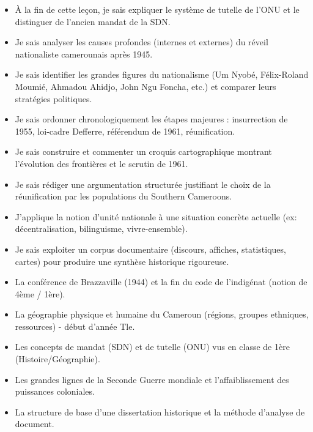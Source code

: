 \documentclass[11pt]{article}
\begin{document}
\begin{objectifs}
\begin{itemize}
\item À la fin de cette leçon, je sais expliquer le système de tutelle de l'ONU et le distinguer de l'ancien mandat de la SDN.
\item Je sais analyser les causes profondes (internes et externes) du réveil nationaliste camerounais après 1945.
\item Je sais identifier les grandes figures du nationalisme (Um Nyobé, Félix-Roland Moumié, Ahmadou Ahidjo, John Ngu Foncha, etc.) et comparer leurs stratégies politiques.
\item Je sais ordonner chronologiquement les étapes majeures : insurrection de 1955, loi-cadre Defferre, référendum de 1961, réunification.
\item Je sais construire et commenter un croquis cartographique montrant l'évolution des frontières et le scrutin de 1961.
\item Je sais rédiger une argumentation structurée justifiant le choix de la réunification par les populations du Southern Cameroons.
\item J'applique la notion d'unité nationale à une situation concrète actuelle (ex: décentralisation, bilinguisme, vivre-ensemble).
\item Je sais exploiter un corpus documentaire (discours, affiches, statistiques, cartes) pour produire une synthèse historique rigoureuse.
\end{itemize}
\end{objectifs}

\begin{prerequis}
\begin{itemize}
\item La conférence de Brazzaville (1944) et la fin du code de l'indigénat (notion de 4ème / 1ère).
\item La géographie physique et humaine du Cameroun (régions, groupes ethniques, ressources) - début d'année Tle.
\item Les concepts de mandat (SDN) et de tutelle (ONU) vus en classe de 1ère (Histoire/Géographie).
\item Les grandes lignes de la Seconde Guerre mondiale et l'affaiblissement des puissances coloniales.
\item La structure de base d'une dissertation historique et la méthode d'analyse de document.
\end{itemize}
\end{prerequis}
\end{document}
